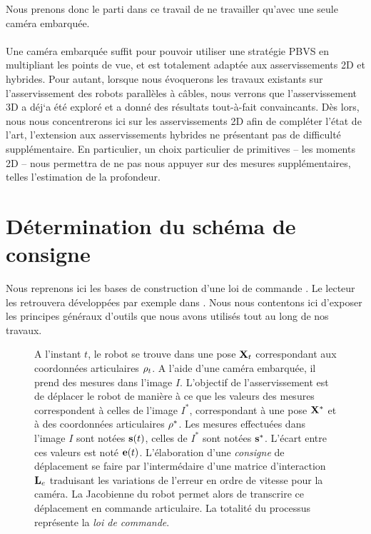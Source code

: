 Nous prenons donc le parti dans ce travail de ne travailler qu'avec une seule 
cam\'era embarqu\'ee.\\

\\

Une cam\'era embarqu\'ee suffit pour pouvoir utiliser une strat\'egie PBVS en 
multipliant les points de vue, et est totalement adapt\'ee aux asservissements 
2D et hybrides. Pour autant, lorsque nous \'evoquerons les travaux existants 
sur l'asservissement des robots parall\`eles \`a c\^ables, nous verrons que 
l'asservissement 3D a d\'ej`a \'et\'e explor\'e et a donn\'e des r\'esultats 
tout-\`a-fait convaincants. D\`es lors, nous nous concentrerons ici sur les 
asservissements 2D afin de compl\'eter l'\'etat de l'art, l'extension aux 
asservissements hybrides ne pr\'esentant pas de difficult\'e suppl\'ementaire. 
En particulier, un choix particulier de primitives -- les moments 2D -- nous 
permettra de ne pas nous appuyer sur des mesures suppl\'ementaires, telles 
l'estimation de la profondeur.

\section{D\'etermination du sch\'ema de consigne}\label{chap1-2}

Nous reprenons ici les bases de construction d'une loi de commande 
\cite{samson1991}. Le lecteur les retrouvera développées par exemple dans 
\cite{chaumette2008handbook}. Nous nous contentons ici d'exposer les principes 
généraux d'outils que nous avons utilisés tout au long de nos travaux.

\begin{figure}[htp]
  \centering
    \def\svgwidth{.95\linewidth}
  
  \vspace{-15mm}
    \caption{\footnotesize{A l'instant $t$, le robot se trouve dans une pose ${\bf X}_t$ correspondant aux coordonnées articulaires ${\bf \rho}_t$. A l'aide d'une caméra embarquée, il prend des mesures dans l'image $I$. L'objectif de l'asservissement est de déplacer le robot de manière à ce que les valeurs des mesures correspondent à celles de l'image $I^*$, correspondant à une pose ${\bf X}^*$ et à des coordonnées articulaires ${\bf \rho}^*$. Les mesures effectuées dans l'image $I$ sont notées ${\bf s}(t)$, celles de $I^*$ sont notées ${\bf s}^*$. L'écart entre ces valeurs est noté ${\bf e}(t)$. L'élaboration d'une {\it consigne} de déplacement se faire par l'intermédaire d'une matrice d'interaction ${\bf L}_e$ traduisant les variations de l'erreur en ordre de vitesse pour la caméra. La Jacobienne du robot permet alors de transcrire ce déplacement en commande articulaire. La totalité du processus représente la {\it loi de commande}.}}
\label{chap01:fig05b}
\end{figure}


